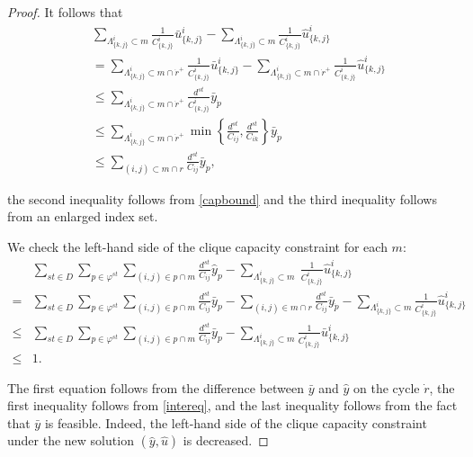 \begin{proof}
It follows that
\begin{equation}
\label{intereq}
\begin{split}
 &\sum_{\Lambda^i_{\{k,j\}} \subset m}  \frac{1}{C^i_{\{k,j\}}} \bar{u}^i_{\{k,j\}}  - \sum_{\Lambda^i_{\{k,j\}} \subset m}  \frac{1}{C^i_{\{k,j\}}}  \widehat{u}^i_{\{k,j\}}    \\
  & = \sum_{\Lambda^i_{\{k,j\}} \subset m \cap \dot{r}^+}  \frac{1}{C^i_{\{k,j\}}} \bar{u}^i_{\{k,j\}}  - \sum_{\Lambda^i_{\{k,j\}} \subset m \cap \dot{r}^+}  \frac{1}{C^i_{\{k,j\}}}  \widehat{u}^i_{\{k,j\}}    \\
 & \le \sum_{\Lambda^i_{\{k,j\}} \subset m \cap \dot{r}^+} \frac{d^{st}}{C^i_{\{k,j\}}} \bar{y}_{\dot{p}} \\
  & \le \sum_{\Lambda^i_{\{k,j\}} \subset m \cap \dot{r}^+} \min \left\{\frac{d^{st}}{C_{ij}}, \frac{d^{st}}{C_{ik}} \right\} \bar{y}_{\dot{p}}\\
  & \le \sum_{(i,j) \subset m \cap r } \frac{d^{st}}{C_{ij}} \bar{y}_{\dot{p}},
 \end{split}
\end{equation}

the second inequality follows from \eqref{capbound} and the third inequality follows from an enlarged index set.

We check the left-hand side of the clique capacity constraint for each \(m\):
\begin{equation}
\begin{split}
&\sum_{st \in D} \sum_{p \in \varphi^{st}} \sum_{(i,j) \in p \cap m} \frac{d^{st}}{C_{ij}}\widehat{y}_p  - \sum_{\Lambda^i_{\{k,j\}} \subset m}   \  \frac{1}{C^i_{\{k,j\}}}\widehat{u}^i_{\{k,j\}} \\
= & \sum_{st \in D} \sum_{p \in \varphi^{st}} \sum_{(i,j) \in p \cap m} \frac{d^{st}}{C_{ij}}\bar{y}_p - \sum_{(i,j) \in  m \cap r} \frac{d^{st}}{C_{ij}}\bar{y}_{\dot{p}} - \sum_{\Lambda^i_{\{k,j\}} \subset m}    \frac{1}{C^i_{\{k,j\}}} \widehat{u}^i_{\{k,j\}} \\
\le& \sum_{st \in D} \sum_{p \in \varphi^{st}} \sum_{(i,j) \in p \cap m} \frac{d^{st}}{C_{ij}}\bar{y}_p -  \sum_{\Lambda^i_{\{k,j\}} \subset m}   \frac{1}{C^i_{\{k,j\}}} \bar{u}^i_{\{k,j\}}
\\
 \le & 1.
\end{split}
\end{equation}

The first equation follows from the difference between \(\bar{y}\) and \(\widehat{y}\) on the cycle \(\dot{r}\), the first inequality follows from \eqref{intereq}, and the last inequality follows from the fact that \(\bar{y}\) is feasible.  Indeed, the left-hand side of the clique capacity constraint under the new solution \((\widehat{y}, \widehat{u})\) is decreased.


\end{proof}
